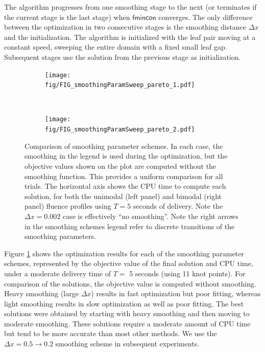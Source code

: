 \documentclass{iopart}
\begin{document}
The algorithm progresses from one smoothing stage to the next (or terminates if the current stage is the last stage) when $\mathsf{fmincon}$ converges. 
The only difference between the optimization in two consecutive stages is the smoothing distance $\Delta x$ and the initialization.
The algorithm is initialized with the leaf pair moving at a constant speed, sweeping the entire domain with a fixed small leaf gap. Subsequent stages use the solution from the previous stage as initialization.

\begin{figure}[t!]
    \centering
    \begin{subfigure}[b]{0.5\textwidth}
        \centering
        \texttt{[image: fig/FIG\_smoothingParamSweep\_pareto\_1.pdf]}
        \caption{}
    \end{subfigure}%
    ~ 
    \begin{subfigure}[b]{0.5\textwidth}
        \centering
        \texttt{[image: fig/FIG\_smoothingParamSweep\_pareto\_2.pdf]}
        \caption{}
    \end{subfigure}
    \caption{Comparison of smoothing parameter schemes. In each case, the smoothing in the legend is used during the optimization, but the objective values shown on the plot are computed without the smoothing function. This provides a uniform comparison for all trials. The horizontal axis shows the CPU time to compute each solution, for both the unimodal (left panel) and bimodal (right panel) fluence profiles using $T=5$ seconds of delivery. Note the $\Delta x =0.002$ case is effectively ``no smoothing''. Note the right arrows in the smoothing schemes legend refer to discrete transitions of the smoothing parameters.}
  \label{fig:smoothingParamSweep_pareto}
\end{figure}





Figure \ref{fig:smoothingParamSweep_pareto} shows the optimization results for each of the smoothing parameter schemes, represented by the objective value of the final solution and CPU time, under a moderate delivery time of $T=$ 5 seconds (using 11 knot points). For comparison of the solutions, the objective value is computed without smoothing. Heavy smoothing (large $\Delta x$) results in fast optimization but poor fitting, whereas light smoothing results in slow optimization as well as poor fitting.
The best solutions were obtained by starting with heavy smoothing and then moving to moderate smoothing.
These solutions require a moderate amount of CPU time but tend to be more accurate than most other methods.
We use the $ \Delta x = 0.5 \rightarrow 0.2 $ smoothing scheme in subsequent experiments.
\end{document}
